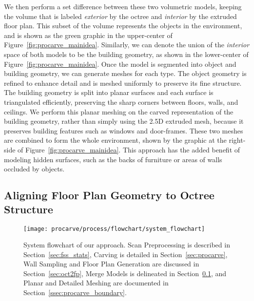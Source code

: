 \documentclass[12pt,onecolumn,oneside]{book}
\begin{document}
We then perform a set difference between these two volumetric models, keeping the volume that is labeled {\it exterior} by the octree and {\it interior} by the extruded floor plan.  This subset of the volume represents the objects in the environment, and is shown as the green graphic in the upper-center of Figure~\ref{fig:procarve_mainidea}.  Similarly, we can denote the union of the {\it interior} space of both models to be the building geometry, as shown in the lower-center of Figure~\ref{fig:procarve_mainidea}.  Once the model is segmented into object and building geometry, we can generate meshes for each type.  The object geometry is refined to enhance detail and is meshed uniformly to preserve its fine structure.  The building geometry is split into planar surfaces and each surface is triangulated efficiently, preserving the sharp corners between floors, walls, and ceilings.  We perform this planar meshing on the carved representation of the building geometry, rather than simply using the 2.5D extruded mesh, because it preserves building features such as windows and door-frames.  These two meshes are combined to form the whole environment, shown by the graphic at the right-side of Figure~\ref{fig:procarve_mainidea}.  This approach has the added benefit of modeling hidden surfaces, such as the backs of furniture or areas of walls occluded by objects.

\subsection{Aligning Floor Plan Geometry to Octree Structure}
\label{ssec:procarve_fp_alignment}

\begin{figure}[t]
	\centerline{\texttt{[image: procarve/process/flowchart/system\_flowchart]}}
	\caption[System flowchart of our approach.]{System flowchart of our approach.  Scan Preprocessing is described in Section~\ref{sec:fss_stats}, Carving is detailed in Section~\ref{sec:procarve}, Wall Sampling and Floor Plan Generation are discussed in Section~\ref{sec:oct2fp}, Merge Models is delineated in Section~\ref{ssec:procarve_fp_alignment}, and Planar and Detailed Meshing are documented in Section~\ref{ssec:procarve_boundary}.}
	\label{fig:procarve_flowchart}
\end{figure}
\end{document}
